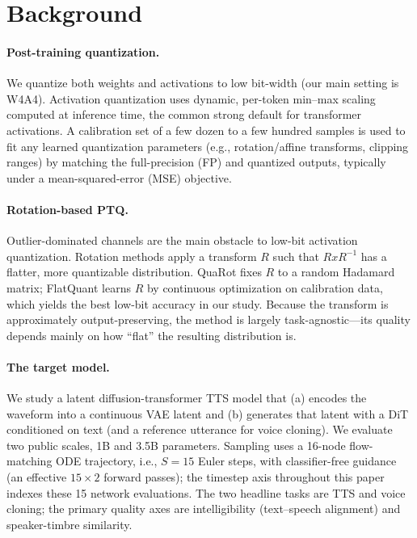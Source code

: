 \section{Background}
 
\paragraph{Post-training quantization.}
We quantize both weights and activations to low bit-width (our main setting is W4A4). Activation quantization uses dynamic, per-token min--max scaling computed at inference time, the common strong default for transformer activations. A calibration set of a few dozen to a few hundred samples is used to fit any learned quantization parameters (e.g., rotation/affine transforms, clipping ranges) by matching the full-precision (FP) and quantized outputs, typically under a mean-squared-error (MSE) objective.
 
\paragraph{Rotation-based PTQ.}
Outlier-dominated channels are the main obstacle to low-bit activation quantization. Rotation methods apply a transform $R$ such that $R x R^{-1}$ has a flatter, more quantizable distribution. QuaRot fixes $R$ to a random Hadamard matrix; FlatQuant learns $R$ by continuous optimization on calibration data, which yields the best low-bit accuracy in our study. Because the transform is approximately output-preserving, the method is largely task-agnostic---its quality depends mainly on how ``flat'' the resulting distribution is.
 
\paragraph{The target model.}
We study a latent diffusion-transformer TTS model that (a) encodes the waveform into a continuous VAE latent and (b) generates that latent with a DiT conditioned on text (and a reference utterance for voice cloning). We evaluate two public scales, 1B and 3.5B parameters. Sampling uses a 16-node flow-matching ODE trajectory, i.e., $S{=}15$ Euler steps, with classifier-free guidance (an effective $15{\times}2$ forward passes); the timestep axis throughout this paper indexes these 15 network evaluations. The two headline tasks are TTS and voice cloning; the primary quality axes are intelligibility (text--speech alignment) and speaker-timbre similarity.
